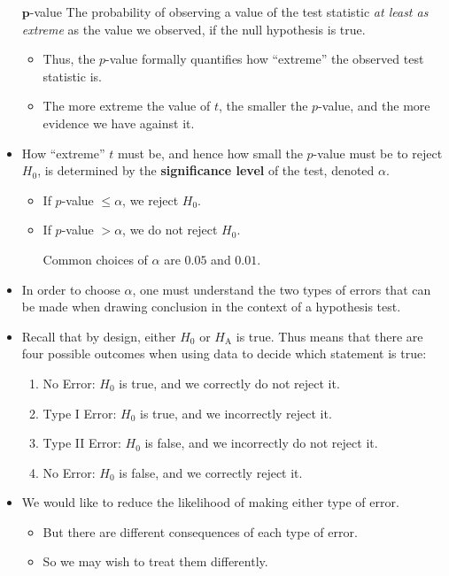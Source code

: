 \begin{itemize}
            \begin{Definition}{$ \symbf{p} $-value}{}
                  The probability of observing a value of the test statistic \emph{at least as extreme}
                  as the value we observed, if the null hypothesis is true.
            \end{Definition}
            \begin{itemize}
                  \item Thus, the $ p $-value formally quantifies how ``extreme'' the observed
                        test statistic is.
                  \item The more extreme the value of $ t $, the smaller the $ p $-value, and the more
                        evidence we have against it.
            \end{itemize}
      \item How ``extreme'' $ t $ must be, and hence how small the $ p $-value must be
            to reject $ H_0 $, is determined by the \textbf{significance level} of the test,
            denoted $ \alpha $.
            \begin{itemize}
                  \item If $ p $-value $ \le \alpha $, we reject $ H_0 $.
                  \item If $ p $-value $ >\alpha $, we do not reject $ H_0 $.
                        \begin{Remark}{}{}
                              Common choices of $ \alpha $ are $ 0.05 $ and $ 0.01 $.
                        \end{Remark}
            \end{itemize}
      \item In order to choose $ \alpha $, one must understand the two types of errors
            that can be made when drawing conclusion in the context of a hypothesis test.
      \item Recall that by design, either $ H_0 $ or $ H_{\text{A}} $ is true.
            Thus means that there are four possible outcomes when using data to decide which
            statement is true:
            \begin{enumerate}[(1)]
                  \item No Error: $ H_0 $ is true, and we correctly do not reject it.
                  \item Type I Error: $ H_0 $ is true, and we incorrectly reject it.
                  \item Type II Error: $ H_0 $ is false, and we incorrectly do not reject it.
                  \item No Error: $ H_0 $ is false, and we correctly reject it.
            \end{enumerate}
      \item We would like to reduce the likelihood of making either type of error.
            \begin{itemize}
                  \item But there are different consequences of each type of error.
                  \item So we may wish to treat them differently.
            \end{itemize}
\end{itemize}
